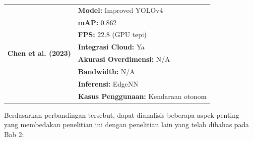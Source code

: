 \begin{table}[htbp]
\begin{tabular}{|l|l|}
    \multirow{8}{*}{\textbf{Chen et al. (2023) \parencite*{Chen2023Edge}}} & \textbf{Model:} Improved YOLOv4 \\
    \cline{2-2}
    & \textbf{mAP:} 0.862 \\
    \cline{2-2}
    & \textbf{FPS:} 22.8 (GPU tepi) \\
    \cline{2-2}
    & \textbf{Integrasi Cloud:} Ya \\
    \cline{2-2}
    & \textbf{Akurasi Overdimensi:} N/A \\
    \cline{2-2}
    & \textbf{Bandwidth:} N/A \\
    \cline{2-2}
    & \textbf{Inferensi:} EdgeNN \\
    \cline{2-2}
    & \textbf{Kasus Penggunaan:} Kendaraan otonom \\
    \hline
  \end{tabular}
\end{table}

Berdasarkan perbandingan tersebut, dapat dianalisis beberapa aspek penting yang membedakan penelitian ini dengan penelitian lain yang telah dibahas pada Bab 2:

